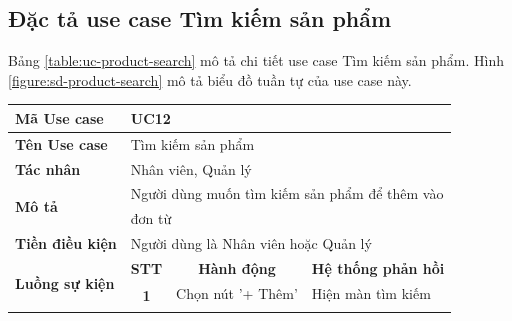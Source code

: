 \documentclass[../DoAn.tex]{subfiles}
\begin{document}
\subsection{Đặc tả use case Tìm kiếm sản phẩm}
\label{section:uc-product-search}
Bảng \ref{table:uc-product-search} mô tả chi tiết use case Tìm kiếm sản phẩm. Hình \ref{figure:sd-product-search} mô tả biểu đồ tuần tự của use case này.
\begin{table}[H]
    \begin{tabular}{|l|c|l|l|}
        \hline
        \textbf{Mã Use case}                    & \multicolumn{3}{l|}{UC12}                                                                                                                                      \\ \hline
        \textbf{Tên Use case}                   & \multicolumn{3}{l|}{Tìm kiếm sản phẩm}                                                                                                                         \\ \hline
        \textbf{Tác nhân}                       & \multicolumn{3}{l|}{Nhân viên, Quản lý}                                                                                                                        \\ \hline
        \multirow{2}{*}{\textbf{Mô tả} }        & \multicolumn{3}{l|}{Người dùng muốn tìm kiếm sản phẩm để thêm vào}                                                                                             \\
                                                & \multicolumn{3}{l|}{đơn từ}                                                                                                                                    \\ \hline
        \textbf{Tiền điều kiện}                 & \multicolumn{3}{l|}{Người dùng là Nhân viên hoặc Quản lý}                                                                                                      \\ \hline
        \multirow{6}{*}{\textbf{Luồng sự kiện}} & \multicolumn{1}{c|}{\textbf{STT}}                                  & \multicolumn{1}{c|}{\textbf{Hành động}} & \multicolumn{1}{c|}{\textbf{Hệ thống phản hồi}} \\ \cline{2-4}
                                                & \multirow{5}{*}{\textbf{1}}                                        & Chọn nút '+ Thêm'                       & Hiện màn tìm kiếm                               \\ \cline{3-4}

\end{tabular}
\end{table}
\end{document}
